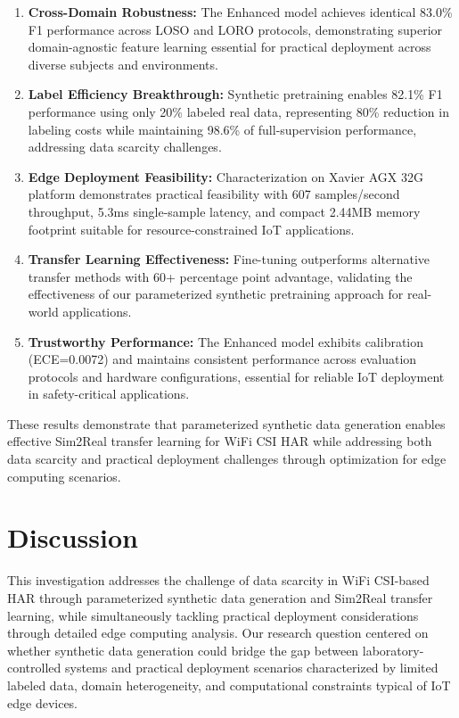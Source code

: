 \documentclass[journal]{IEEEtran}
\begin{document}
\begin{enumerate}
\item \textbf{Cross-Domain Robustness:} The Enhanced model achieves identical 83.0\% F1 performance across LOSO and LORO protocols, demonstrating superior domain-agnostic feature learning essential for practical deployment across diverse subjects and environments.

\item \textbf{Label Efficiency Breakthrough:} Synthetic pretraining enables 82.1\% F1 performance using only 20\% labeled real data, representing 80\% reduction in labeling costs while maintaining 98.6\% of full-supervision performance, addressing data scarcity challenges.

\item \textbf{Edge Deployment Feasibility:} Characterization on Xavier AGX 32G platform demonstrates practical feasibility with 607 samples/second throughput, 5.3ms single-sample latency, and compact 2.44MB memory footprint suitable for resource-constrained IoT applications.

\item \textbf{Transfer Learning Effectiveness:} Fine-tuning outperforms alternative transfer methods with 60+ percentage point advantage, validating the effectiveness of our parameterized synthetic pretraining approach for real-world applications.

\item \textbf{Trustworthy Performance:} The Enhanced model exhibits calibration (ECE=0.0072) and maintains consistent performance across evaluation protocols and hardware configurations, essential for reliable IoT deployment in safety-critical applications.
\end{enumerate}

These results demonstrate that parameterized synthetic data generation enables effective Sim2Real transfer learning for WiFi CSI HAR while addressing both data scarcity and practical deployment challenges through optimization for edge computing scenarios.

\section{Discussion}

This investigation addresses the challenge of data scarcity in WiFi CSI-based HAR through parameterized synthetic data generation and Sim2Real transfer learning, while simultaneously tackling practical deployment considerations through detailed edge computing analysis. Our research question centered on whether synthetic data generation could bridge the gap between laboratory-controlled systems and practical deployment scenarios characterized by limited labeled data, domain heterogeneity, and computational constraints typical of IoT edge devices.
\end{document}
